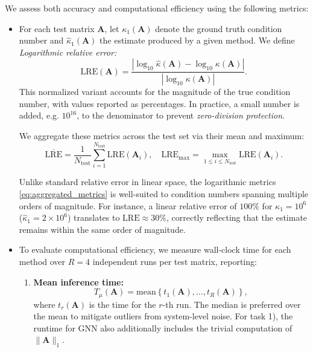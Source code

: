 \documentclass[11pt,a4paper]{article}
\theoremstyle{plain}
\theoremstyle{definition}
\theoremstyle{remark}
\begin{document}
We assess both accuracy and computational efficiency using the following metrics:
\begin{itemize}
    \item For each test matrix $\mathbf{A}$, let $\kappa_1(\mathbf{A})$ denote the ground truth condition number and $\hat{\kappa}_1(\mathbf{A})$ the estimate produced by a given method. We define \emph{Logarithmic relative error:}
\begin{equation}
\mathrm{LRE}(\mathbf{A}) = \frac{\left| \log_{10} \hat{\kappa}(\mathbf{A}) - \log_{10} \kappa(\mathbf{A}) \right|}{\left| \log_{10} \kappa(\mathbf{A}) \right|}.
\label{eq:lre}
\end{equation}
This normalized variant accounts for the magnitude of the true condition number, with values reported as percentages. In practice, a small number is added, e.g. $10^{16}$, to the denominator to prevent \emph{zero-division protection}.



We aggregate these metrics across the test set via their mean and maximum:
\begin{equation}
\overline{\mathrm{LRE}} = \frac{1}{N_{\mathrm{test}}} \sum_{i=1}^{N_{\mathrm{test}}} \mathrm{LRE}(\mathbf{A}_i), \quad
\mathrm{LRE}_{\max} = \max_{1 \leq i \leq N_{\mathrm{test}}} \mathrm{LRE}(\mathbf{A}_i).
\label{eq:aggregated_metrics}
\end{equation}

Unlike standard relative error in linear space, the logarithmic metrics \eqref{eq:aggregated_metrics} is well-suited to condition numbers spanning multiple orders of magnitude. For instance, a linear relative error of $100\%$ for $\kappa_1 = 10^6$ ($\hat{\kappa}_1 = 2 \times 10^6$) translates to $\mathrm{LRE} \approx 30\%$, correctly reflecting that the estimate remains within the same order of magnitude.


\item  To evaluate computational efficiency, we measure wall-clock time for each method over $R = 4$ independent runs per test matrix, reporting:

\begin{enumerate}
\item \textbf{Mean inference time:}
\begin{equation}
T_{\mu}(\mathbf{A}) = \mathrm{mean}\left\{ t_1(\mathbf{A}), \ldots, t_R(\mathbf{A}) \right\},
\label{eq:median_time}
\end{equation}
where $t_r(\mathbf{A})$ is the time for the $r$-th run. The median is preferred over the mean to mitigate outliers from system-level noise. For task 1), the runtime for GNN also additionally includes the trivial computation of $\|\mathbf{A}\|_1$. 


\end{enumerate}
\end{itemize}
\end{document}
